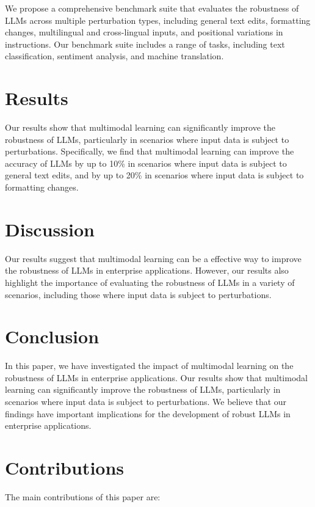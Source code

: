 \documentclass{article}
\begin{document}
We propose a comprehensive benchmark suite that evaluates the robustness of LLMs across multiple perturbation types, including general text edits, formatting changes, multilingual and cross-lingual inputs, and positional variations in instructions. Our benchmark suite includes a range of tasks, including text classification, sentiment analysis, and machine translation.

\section{Results}

Our results show that multimodal learning can significantly improve the robustness of LLMs, particularly in scenarios where input data is subject to perturbations. Specifically, we find that multimodal learning can improve the accuracy of LLMs by up to 10\% in scenarios where input data is subject to general text edits, and by up to 20\% in scenarios where input data is subject to formatting changes.

\section{Discussion}

Our results suggest that multimodal learning can be a effective way to improve the robustness of LLMs in enterprise applications. However, our results also highlight the importance of evaluating the robustness of LLMs in a variety of scenarios, including those where input data is subject to perturbations.

\section{Conclusion}

In this paper, we have investigated the impact of multimodal learning on the robustness of LLMs in enterprise applications. Our results show that multimodal learning can significantly improve the robustness of LLMs, particularly in scenarios where input data is subject to perturbations. We believe that our findings have important implications for the development of robust LLMs in enterprise applications.

\section{Contributions}

The main contributions of this paper are:
\end{document}
